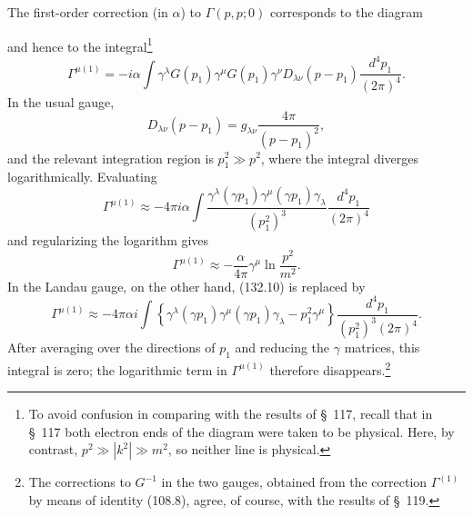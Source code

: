 The first-order correction (in $\alpha$) to $\Gamma(p,p;0)$ corresponds to the diagram
\begin{center}
\end{center}
and hence to the integral\footnote{To avoid confusion in comparing with the results of \S~117, recall that in \S~117 both electron ends of the diagram were taken to be physical. Here, by contrast, $p^2\gg|k^2|\gg m^2$, so neither line is physical.}
\begin{equation}
\Gamma^{\mu(1)}=-i\alpha\int\gamma^\lambda G(p_1)\gamma^\mu G(p_1)\gamma^\nu D_{\lambda\nu}(p-p_1)\frac{d^4p_1}{(2\pi)^4}.
\tag{132.9}
\end{equation}
In the usual gauge,
\[
D_{\lambda\nu}(p-p_1)=g_{\lambda\nu}\frac{4\pi}{(p-p_1)^2},
\]
and the relevant integration region is $p_1^2\gg p^2$, where the integral diverges logarithmically. Evaluating
\begin{equation}
\Gamma^{\mu(1)}\approx-4\pi i\alpha\int
\frac{\gamma^\lambda(\gamma p_1)\gamma^\mu(\gamma p_1)\gamma_\lambda}{(p_1^2)^3}
\frac{d^4p_1}{(2\pi)^4}
\tag{132.10}
\end{equation}
and regularizing the logarithm gives
\[
\Gamma^{\mu(1)}\approx-\frac{\alpha}{4\pi}\gamma^\mu\ln\frac{p^2}{m^2}.
\]
In the Landau gauge, on the other hand, (132.10) is replaced by
\[
\Gamma^{\mu(1)}\approx-4\pi\alpha i\int
\left\{\gamma^\lambda(\gamma p_1)\gamma^\mu(\gamma p_1)\gamma_\lambda-p_1^2\gamma^\mu\right\}
\frac{d^4p_1}{(p_1^2)^3(2\pi)^4}.
\]
After averaging over the directions of $p_1$ and reducing the $\gamma$ matrices, this integral is zero; the logarithmic term in $\Gamma^{\mu(1)}$ therefore disappears.\footnote{The corrections to $G^{-1}$ in the two gauges, obtained from the correction $\Gamma^{(1)}$ by means of identity (108.8), agree, of course, with the results of \S~119.}

